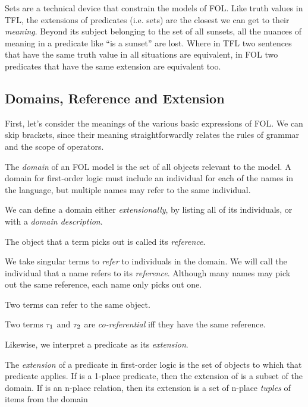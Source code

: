 Sets are a technical device that constrain the models of FOL. Like truth values
in TFL, the extensions of predicates (i.e. sets) are the closest we can get to
their \emph{meaning}. Beyond its subject belonging to the set of all sunsets,
all the nuances of meaning in a predicate like ``is a sunset'' are lost. Where
in TFL two sentences that have the same truth value in all situations are
equivalent, in FOL two predicates that have the same extension are equivalent
too.

\subsection{Domains, Reference and Extension}

First, let's consider the meanings of the various basic expressions of FOL. We
can skip brackets, since their meaning straightforwardly relates the rules of
grammar and the scope of operators.

\begin{definition}[Domain]
  \label{def:fol-domain-set}
  The \emph{domain} of an FOL model is the set of all objects relevant to the
  model. A domain for first-order logic must include an individual for each of
  the names in the language, but multiple names may refer to the same
  individual.
\end{definition}

We can define a domain either \emph{extensionally}, by listing all of its
individuals, or with a \emph{domain description}.

The object that a term picks out is called its \emph{reference}.

\begin{definition}[Reference]
\label{def:fol-reference}
We take singular terms to \emph{refer} to individuals in the domain. We will
call the individual that a name refers to its \emph{reference}. Although
many names may pick out the same reference, each name only picks out one.
\end{definition}

Two terms can refer to the same object.

\begin{definition}[Coreference]
  \label{def:fol-coreference}
  Two terms $\tau_1$ and $\tau_2$ are \emph{co-referential} iff they have the
  same reference.
\end{definition}

Likewise, we interpret a predicate as its \emph{extension}.

\begin{definition}
  \label{def:fol-extension}
  The \emph{extension} of a predicate in first-order logic is the set
  of objects to which that predicate applies. If \ebeta is a 1-place predicate,
  then the extension of \ebeta is a subset of the domain. If \ebeta is an
  n-place relation, then its extension is a set of n-place \emph{tuples} of
  items from the domain
\end{definition}

